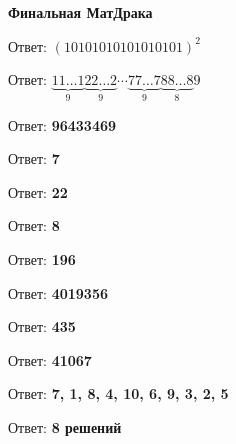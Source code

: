 \centerline{\bf \Huge Финальная МатДрака}

 Ответ: \textbf{$(10101010101010101)^2$}

 Ответ: \textbf{$\underbrace{11 \ldots 1}_9 \underbrace{22 \ldots 2}_9 \cdots \underbrace{77 \ldots 7}_9 \underbrace{88 \ldots 8}_8 9$}

 Ответ: \textbf{96433469}

 Ответ: \textbf{7}

 Ответ: \textbf{22}

 Ответ: \textbf{8}

 Ответ: \textbf{196}

 Ответ: \textbf{4019356}

 Ответ: \textbf{435}

 Ответ: \textbf{41067}

 Ответ: \textbf{7, 1, 8, 4, 10, 6, 9, 3, 2, 5}

 Ответ: \textbf{8 решений}



